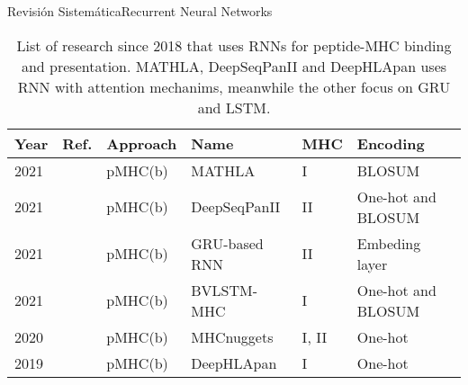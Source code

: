 \documentclass[10pt]{beamer}
\newcommand{\1}{
	\setbeamertemplate{background}{
		\texttt{[image: img/1]}
		\tikz[overlay] \fill[fill opacity=0.75,fill=white] (0,0) rectangle (-\paperwidth,\paperheight);
	}
}
\begin{document}
\begin{frame}{Revisión Sistemática}{Recurrent Neural Networks}
	
	\fontsize{8pt}{5pt}\selectfont
	
	\begin{table}[]
		\centering
		\caption{List of research since 2018 that uses RNNs for peptide-MHC binding and presentation. MATHLA, DeepSeqPanII and DeepHLApan uses RNN with attention mechanims, meanwhile the other focus on GRU and LSTM.}		
		\setlength{\tabcolsep}{0.5em} %
		{\renewcommand{\arraystretch}{2}%
			\begin{tabular}{p{0.6cm}p{0.6cm}p{1.5cm}p{2cm}p{0.6cm}p{2.7cm}}
				\textbf{Year} & \textbf{Ref.}                               & \textbf{Approach}   & \textbf{Name} & \textbf{MHC} & \textbf{Encoding}                                                                                                                                                                                                                         \\ \hline
				2021          & \cite{ye2021mathla}        & pMHC(b) & MATHLA        & I        & BLOSUM                      \\
				
				2021          & \cite{liu2021deepseqpanii} & pMHC(b)                     & DeepSeqPanII                      & II       & One-hot  and BLOSUM                                                    \\
				
				2021          & \cite{heng2021simple}      & pMHC(b)                     & GRU-based RNN                     & II       & Embeding layer                                                        \\
				
				2021          & \cite{jiang2021predicting} & pMHC(b)                     & BVLSTM-MHC                        & I        & One-hot  and BLOSUM                                                                        \\
				
				2020          & \cite{shao2020high}        & pMHC(b)                     & MHCnuggets                        & I, II & One-hot                \\
				
				2019          & \cite{wu2019deephlapan}    & pMHC(b)                     & DeepHLApan                        & I        & One-hot                     
			\end{tabular}
		}
	\end{table}	
\end{frame}
\end{document}
